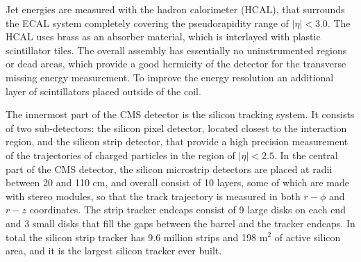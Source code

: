 Jet energies are measured with the hadron calorimeter (HCAL),
that surrounds 
the ECAL system completely covering the pseudorapidity range of $|\eta| < 
3.0$.
The HCAL uses brass as an absorber material, which is interlayed with 
plastic 
scintillator tiles.
%
The overall assembly has essentially no uninstrumented regions or dead 
areas, which provide 
a good hermicity of the detector for the transverse missing energy 
measurement.
To improve the energy resolution an additional layer of scintillators
placed outside of the coil.
 
 The innermost part of the CMS detector is the silicon tracking system.
It consists of two sub-detectors: the silicon pixel detector, located 
closest to the interaction 
 region, and the silicon strip detector, that provide a high precision 
measurement of the trajectories
 of charged particles in the region of $|\eta| < 2.5$.
 In the central part of the CMS detector, the silicon microstrip detectors 
are placed 
 at radii between 20 and 110 cm, and overall 
 consist of 10 layers, some of which
are made with stereo modules, 
 so that the track trajectory is measured in 
 both $r-\phi$ and $r-z$ coordinates.
 The strip tracker endcaps consist of 9 large disks on each end
 and 
 3 small disks that fill the gaps between the barrel and the tracker 
endcaps.
  In total the silicon strip tracker has 9.6 million strips and 198 m$^2$
of active silicon area, and it is the largest silicon tracker ever built.

